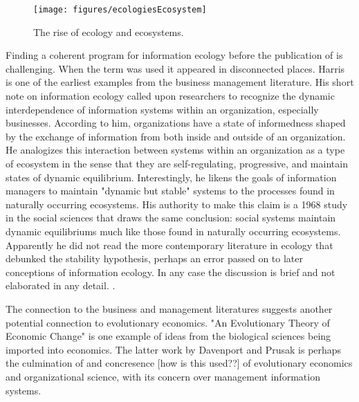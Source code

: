 \begin{figure}[!ht]
  \centering
    \texttt{[image: figures/ecologiesEcosystem]}
  \caption{The rise of ecology and ecosystems.}
\end{figure} 

Finding a coherent program for information ecology before the publication of \citep{nardi_information_1999, davenport_information_1997} is challenging. When the term was used it appeared in disconnected places. Harris is one of the earliest examples from the business management literature. His short note on information ecology called upon researchers to recognize the dynamic interdependence of information systems within an organization, especially businesses. According to him, organizations have a state of informedness shaped by the exchange of information from both inside and outside of an organization. He analogizes this interaction between systems within an organization as a type of ecosystem in the sense that they are self-regulating, progressive, and maintain states of dynamic equilibrium. Interestingly, he likens the goals of information managers to maintain "dynamic but stable" systems to the processes found in naturally occurring ecosystems. His authority to make this claim is a 1968 study in the social sciences that draws the same conclusion: social systems maintain dynamic equilibriums much like those found in naturally occurring ecosystems. Apparently he did not read the more contemporary literature in ecology that debunked the stability hypothesis, perhaps an error passed on to later conceptions of information ecology. In any case the discussion is brief and not elaborated in any detail. \citep{harris_information_1989}.

The connection to the business and management literatures suggests another potential connection to evolutionary economics. "An Evolutionary Theory of Economic Change" \citep{nelson_evolutionary_1985} is one example of ideas from the biological sciences being imported into economics. The latter work by Davenport and Prusak is perhaps the culmination of and concresence [how is this used??] of evolutionary economics and organizational science, with its concern over management information systems.

